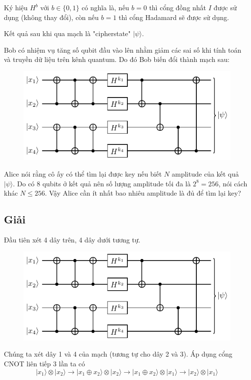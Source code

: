 Ký hiệu $H^b$ với $b \in \{ 0, 1 \}$ có nghĩa là, nếu $b = 0$ thì cổng đồng nhất $I$ được sử dụng (không thay đổi), còn nếu $b = 1$ thì cổng Hadamard sẽ được sử dụng.

Kết quả sau khi qua mạch là "cipherstate" $\lvert \psi \rangle$.

Bob có nhiệm vụ tăng số qubit đầu vào lên nhằm giảm các sai số khi tính toán và truyền dữ liệu trên kênh quantum. Do đó Bob biến đổi thành mạch sau:

\begin{figure}[ht]
    \centering
    \includegraphics[page=2]{nsucrypto/problem10_figures.pdf}
\end{figure}
Alice nói rằng cô ấy có thể tìm lại được key nếu biết $N$ amplitude của kết quả $\lvert \psi \rangle$. Do có 8 qubits ở kết quả nên số lượng amplitude tối đa là $2^8 = 256$, nói cách khác $N \leqslant 256$. Vậy Alice cần ít nhất bao nhiêu amplitude là đủ để tìm lại key?

\subsection*{Giải}

Đầu tiên xét 4 dây trên, 4 dây dưới tương tự.

\begin{figure}[ht]
    \centering
    \includegraphics[page=3]{nsucrypto/problem10_figures.pdf}
\end{figure}
Chúng ta xét dây 1 và 4 của mạch (tương tự cho dây 2 và 3). Áp dụng cổng CNOT liên tiếp 3 lần ta có
\begin{equation*}
    \lvert x_1 \rangle \otimes \lvert x_2 \rangle \to \lvert x_1 \oplus x_2 \rangle \otimes \lvert x_2 \rangle \to \lvert x_1 \oplus x_2 \rangle \otimes \lvert x_1 \rangle \to \lvert x_2 \rangle \otimes \lvert x_1 \rangle
\end{equation*}

